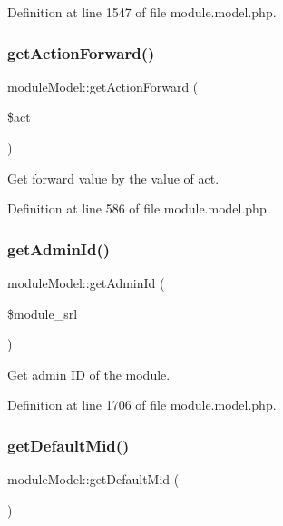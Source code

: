 Definition at line 1547 of file module.\+model.\+php.

\hypertarget{classmoduleModel_a2a06b59fa663c1e79f81aac571e2e5c8}{}\label{classmoduleModel_a2a06b59fa663c1e79f81aac571e2e5c8} 
\subsubsection{\texorpdfstring{get\+Action\+Forward()}{getActionForward()}}
{\footnotesize\ttfamily module\+Model\+::get\+Action\+Forward (\begin{DoxyParamCaption}\item[{}]{\$act }\end{DoxyParamCaption})}



Get forward value by the value of act. 



Definition at line 586 of file module.\+model.\+php.

\hypertarget{classmoduleModel_a302d180d2acef6331f9123d60f76c8c1}{}\label{classmoduleModel_a302d180d2acef6331f9123d60f76c8c1} 
\subsubsection{\texorpdfstring{get\+Admin\+Id()}{getAdminId()}}
{\footnotesize\ttfamily module\+Model\+::get\+Admin\+Id (\begin{DoxyParamCaption}\item[{}]{\$module\+\_\+srl }\end{DoxyParamCaption})}



Get admin ID of the module. 



Definition at line 1706 of file module.\+model.\+php.

\hypertarget{classmoduleModel_ae76b5be74783d11b676b167ba2c63523}{}\label{classmoduleModel_ae76b5be74783d11b676b167ba2c63523} 
\subsubsection{\texorpdfstring{get\+Default\+Mid()}{getDefaultMid()}}
{\footnotesize\ttfamily module\+Model\+::get\+Default\+Mid (\begin{DoxyParamCaption}{ }\end{DoxyParamCaption})}



